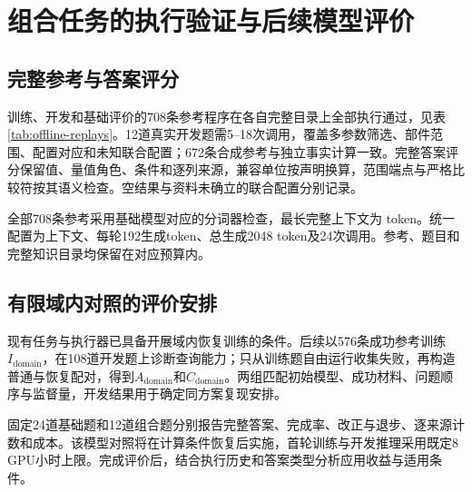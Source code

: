 \section{组合任务的执行验证与后续模型评价}
\label{sec:domain-preparation}

\subsection{完整参考与答案评分}

训练、开发和基础评价的708条参考程序在各自完整目录上全部执行通过，见表\ref{tab:offline-replays}。12道真实开发题需5--18次调用，覆盖多参数筛选、部件范围、配置对应和未知联合配置；672条合成参考与独立事实计算一致。完整答案评分保留值、量值角色、条件和逐列来源，兼容单位按声明换算，范围端点与严格比较符按其语义检查。空结果与资料未确立的联合配置分别记录。

\begin{table}[htbp]
\centering\small
\caption{完整知识目录上的参考程序执行结果}
\label{tab:offline-replays}
\OfflineReplayTable
\end{table}

全部708条参考采用基础模型对应的分词器检查，最长完整上下文为\OfflineMaxContext{} token。统一配置为\OfflineContextBudget{}上下文、每轮192生成token、总生成2048 token及24次调用。参考、题目和完整知识目录均保留在对应预算内。



\subsection{有限域内对照的评价安排}

现有任务与执行器已具备开展域内恢复训练的条件。后续以576条成功参考训练$I_{\mathrm{domain}}$，在108道开发题上诊断查询能力；只从训练题自由运行收集失败，再构造普通与恢复配对，得到$A_{\mathrm{domain}}$和$C_{\mathrm{domain}}$。两组匹配初始模型、成功材料、问题顺序与监督量，开发结果用于确定同方案复现安排。

固定24道基础题和12道组合题分别报告完整答案、完成率、改正与退步、逐来源计数和成本。该模型对照将在计算条件恢复后实施，首轮训练与开发推理采用既定8 GPU小时上限。完成评价后，结合执行历史和答案类型分析应用收益与适用条件。
